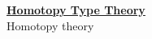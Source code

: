 \documentclass[hott-all.tex]{subfiles}
\begin{document}
\begin{center}
  {\Large{\underline{\textbf{Homotopy Type Theory}}}} \\[2mm]
  {\large Homotopy theory}
\end{center}

\setcounter{chapter}{8}

% 
% 
% 
% 
% 
\end{document}
